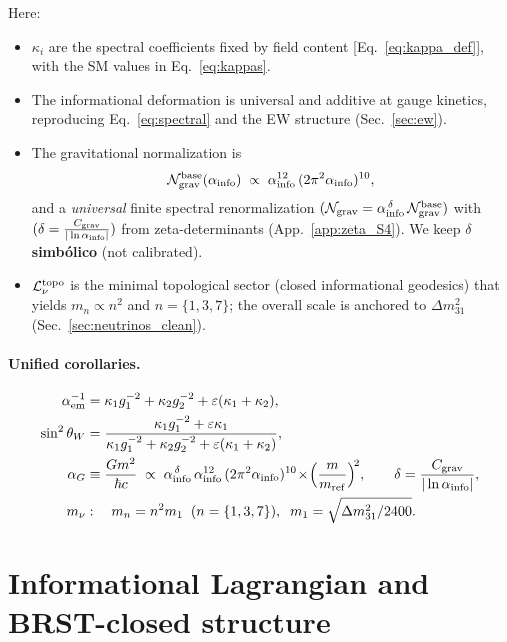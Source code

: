 \documentclass{article}
\numberwithin{equation}{section}
\theoremstyle{plain}
\theoremstyle{definition}
\theoremstyle{remark}
\begin{document}
\noindent
Here:
\begin{itemize}
\item $\kappa_i$ are the spectral coefficients fixed by field content [Eq.~\eqref{eq:kappa_def}], with the SM values in Eq.~\eqref{eq:kappas}.
\item The informational deformation is universal and additive at gauge kinetics, reproducing Eq.~\eqref{eq:spectral} and the EW structure (Sec.~\ref{sec:ew}).
\item The gravitational normalization is
\begin{equation}
\mathcal{N}_{\rm grav}^{\rm base}(\alpha_{\rm info})
\;\propto\;
\alpha_{\rm info}^{12}\,(2\pi^2\alpha_{\rm info})^{10},
\label{eq:Ngrav_base}
\end{equation}
and a \emph{universal} finite spectral renormalization
$(\mathcal{N}_{\rm grav}=\alpha_{\rm info}^{\,\delta}\,\mathcal{N}_{\rm grav}^{\rm base})$
with $(\delta=\tfrac{C_{\rm grav}}{|\ln\alpha_{\rm info}|})$ from zeta-determinants (App.~\ref{app:zeta_S4}). We keep $\delta$ \textbf{simb\'olico} (not calibrated).
\item $\mathcal{L}_{\nu}^{\rm topo}$ is the minimal topological sector (closed informational geodesics) that yields $m_n\propto n^2$ and $n=\{1,3,7\}$; the overall scale is anchored to $\Delta m_{31}^2$ (Sec.~\ref{sec:neutrinos_clean}).
\end{itemize}

\paragraph{Unified corollaries.}
\begin{align}
\alpha_{\rm em}^{-1} &= \kappa_1 g_1^{-2}+\kappa_2 g_2^{-2}+\varepsilon(\kappa_1+\kappa_2), \\
\sin^2\theta_W&=\frac{\kappa_1 g_1^{-2}+\varepsilon \kappa_1}{\kappa_1 g_1^{-2}+\kappa_2 g_2^{-2}+\varepsilon(\kappa_1+\kappa_2)}, \\
\alpha_G &\equiv \frac{Gm^2}{\hbar c}
\;\propto\;
\alpha_{\rm info}^{\,\delta}\,\alpha_{\rm info}^{12}\,(2\pi^2\alpha_{\rm info})^{10}\!\times \!\Big(\frac{m}{m_{\rm ref}}\Big)^{\!2},
\qquad \delta=\frac{C_{\rm grav}}{|\ln\alpha_{\rm info}|}, \\
m_\nu &: \quad m_n=n^2 m_1 \;\;(n=\{1,3,7\}),\;\; m_1=\sqrt{\Delta m_{31}^2/2400}.
\end{align}

\section{Informational Lagrangian and BRST-closed structure}
\label{sec:lagrangian_full}
\end{document}
